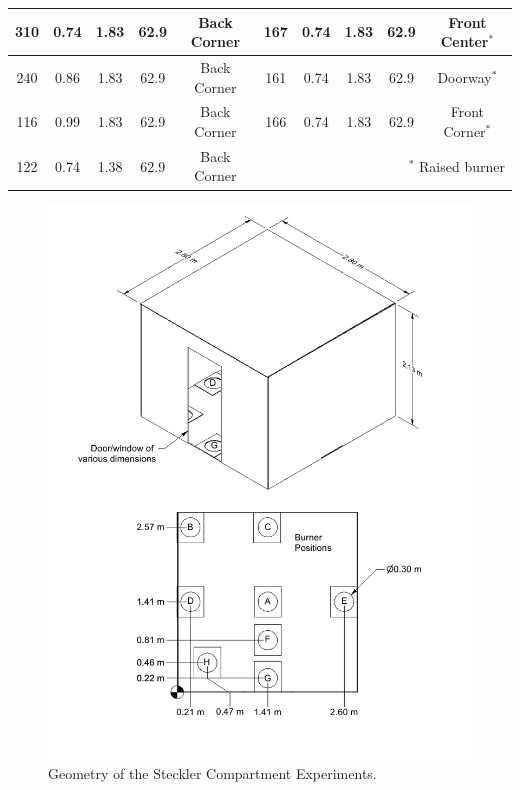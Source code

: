 \begin{table}[h!]
\begin{center}
\begin{tabular}{|c|c|c|c|c||c|c|c|c|c|}
310     & 0.74      & 1.83          &  62.9      & Back Corner  & 167   & 0.74      & 1.83        &  62.9         & Front Center$^*$    \\ \hline
240     & 0.86      & 1.83          &  62.9      & Back Corner  & 161   & 0.74      & 1.83        &  62.9         & Doorway$^*$         \\ \hline
116     & 0.99      & 1.83          &  62.9      & Back Corner  & 166   & 0.74      & 1.83        &  62.9         & Front Corner$^*$    \\ \hline
122     & 0.74      & 1.38          &  62.9      & Back Corner  &  \multicolumn{5}{r|}{$^*$ Raised burner}                   \\ \hline
\end{tabular}
\end{center}
\label{Steckler_Table}
\end{table}


\begin{figure}[!ht]
\includegraphics[width=\textwidth]{FIGURES/Steckler_Compartment/Room_Drawing}
\caption[Geometry of the Steckler Compartment Experiments]{Geometry of the Steckler Compartment Experiments.}
\label{Steckler_ Drawing}
\end{figure}


